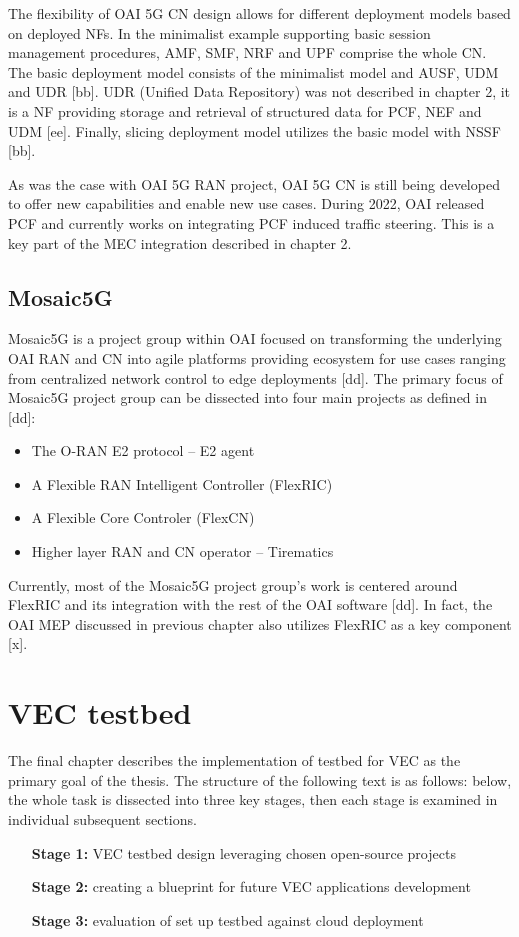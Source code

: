 \documentclass[12pt,a4paper,twoside]{report}
\begin{document}
The flexibility of OAI 5G CN design allows for different deployment models based on deployed NFs. In the minimalist example supporting basic session management procedures, AMF, SMF, NRF and UPF comprise the whole CN. The basic deployment model consists of the minimalist model and AUSF, UDM and UDR [bb]. UDR (Unified Data Repository) was not described in chapter 2, it is a NF providing storage and retrieval of structured data for PCF, NEF and UDM [ee]. Finally, slicing deployment model utilizes the basic model with NSSF [bb]. 

As was the case with OAI 5G RAN project, OAI 5G CN is still being developed to offer new capabilities and enable new use cases. During 2022, OAI released PCF and currently works on integrating PCF induced traffic steering. This is a key part of the MEC integration described in chapter 2.
\section{Mosaic5G}
Mosaic5G is a project group within OAI focused on transforming the underlying OAI RAN and CN into agile platforms providing ecosystem for use cases ranging from centralized network control to edge deployments [dd]. The primary focus of Mosaic5G project group can be dissected into four main projects as defined in [dd]:
\begin{itemize}
	\item The O-RAN E2 protocol – E2 agent
	\item A Flexible RAN Intelligent Controller (FlexRIC)
	\item A Flexible Core Controler (FlexCN)
	\item Higher layer RAN and CN operator – Tirematics
\end{itemize}
Currently, most of the Mosaic5G project group’s work is centered around FlexRIC and its integration with the rest of the OAI software [dd]. In fact, the OAI MEP discussed in previous chapter also utilizes FlexRIC as a key component [x]. 
\chapter{VEC testbed}
\label{Ch:VEC-tstbed}
The final chapter describes the implementation of testbed for VEC as the primary goal of the thesis. The structure of the following text is as follows: below, the whole task is dissected into three key stages, then each stage is examined in individual subsequent sections.
\begin{itemize}
	\item[\textbf{Stage 1:}] VEC testbed design leveraging chosen open-source projects 
	\item[\textbf{Stage 2:}] creating a blueprint for future VEC applications development
	\item[\textbf{Stage 3:}]  evaluation of set up testbed against cloud deployment
\end{itemize}
\end{document}
